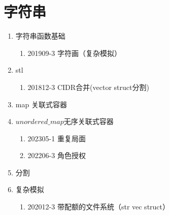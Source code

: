 \documentclass[cn,11pt,chinese]{elegantbook}
\begin{document}
\chapter{字符串}
\begin{introduction}[本人完成的题目]
  \item 
  \begin{enumerate}[\Roman*]
      \item 字符串函数基础
   \begin{enumerate}[\arabic*]
       \item 201909-3 字符画（复杂模拟）
   \end{enumerate}
\item stl
    \begin{enumerate}[\arabic*]
       \item 201812-3 CIDR合并(vector struct分割)
   \end{enumerate}
\item map 关联式容器
\item $unordered\_map $无序关联式容器
    \begin{enumerate}[\arabic*]
      \item 202305-1 重复局面
      \item 202206-3 角色授权
   \end{enumerate}
\item 分割
\item 复杂模拟
  \begin{enumerate}[\arabic*]
    \item 202012-3 带配额的文件系统（str vec struct）
  \end{enumerate}
  \end{enumerate}
\end{introduction}





\end{document}
